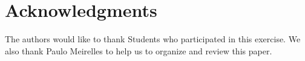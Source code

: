 \section*{Acknowledgments}
\label{sec:acknowledgments}

The authors would like to thank Students who participated in this exercise. We also thank Paulo Meirelles to help us to organize and review this paper.

